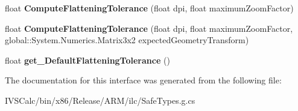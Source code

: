 \begin{DoxyCompactItemize}
\item 
\mbox{\label{interface_microsoft_1_1_graphics_1_1_canvas_1_1_geometry_1_1_i_canvas_geometry_statics_a985c955babc779083dbb22e1289f16fa}} 
float {\bfseries Compute\+Flattening\+Tolerance} (float dpi, float maximum\+Zoom\+Factor)
\item 
\mbox{\label{interface_microsoft_1_1_graphics_1_1_canvas_1_1_geometry_1_1_i_canvas_geometry_statics_a769679f8059f4a5c8dc679bb7d677866}} 
float {\bfseries Compute\+Flattening\+Tolerance} (float dpi, float maximum\+Zoom\+Factor, global\+::\+System.\+Numerics.\+Matrix3x2 expected\+Geometry\+Transform)
\item 
\mbox{\label{interface_microsoft_1_1_graphics_1_1_canvas_1_1_geometry_1_1_i_canvas_geometry_statics_a6b02aa62d9240152adb7fda7324bb0aa}} 
float {\bfseries get\+\_\+\+Default\+Flattening\+Tolerance} ()
\end{DoxyCompactItemize}


The documentation for this interface was generated from the following file\+:\begin{DoxyCompactItemize}
\item 
I\+V\+S\+Calc/bin/x86/\+Release/\+A\+R\+M/ilc/Safe\+Types.\+g.\+cs\end{DoxyCompactItemize}
